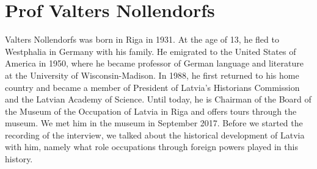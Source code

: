 \section{Prof Valters Nollendorfs}

Valters Nollendorfs was born in Riga in 1931. At the age of 13, he fled to Westphalia in Germany with his family. He emigrated to the United States of America in 1950, where he became professor of German language and literature at the University of Wisconsin-Madison. In 1988, he first returned to his home country and became a member of President of Latvia's Historians Commission and the Latvian Academy of Science. Until today, he is Chairman of the Board of the Museum of the Occupation of Latvia in Riga and offers tours through the museum. We met him in the museum in September 2017. Before we started the recording of the interview, we talked about the historical development of Latvia with him, namely what role occupations through foreign powers played in this history.

